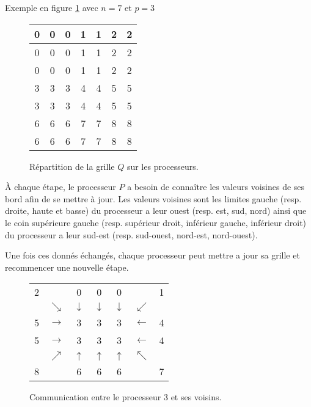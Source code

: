 \documentclass{article}
\begin{document}
Exemple en figure \ref{exemple} avec $n=7$ et $p=3$ 
\begin{figure}[!ht]
\label{exemple}
\begin{center}
\begin{tabular}{|c|c|c||c|c|c||c|}
	\hline
	0 & 0 & 0 & 1 & 1 & 2 & 2 \\
	\hline
	0 & 0 & 0 & 1 & 1 & 2 & 2 \\
	\hline
	0 & 0 & 0 & 1 & 1 & 2 & 2 \\
	\hline \hline
	3 & 3 & 3 & 4 & 4 & 5 & 5 \\
	\hline
	3 & 3 & 3 & 4 & 4 & 5 & 5 \\
	\hline
	6 & 6 & 6 & 7 & 7 & 8 & 8 \\
	\hline \hline
	6 & 6 & 6 & 7 & 7 & 8 & 8 \\
	\hline
\end{tabular}
\end{center}
\caption{Répartition de la grille $Q$ sur les processeurs.}
\end{figure}

\par À chaque étape, le processeur $P$ a besoin de connaître les valeurs voisines de ses bord afin de se mettre à jour. Les valeurs voisines sont les limites gauche (resp. droite, haute et basse) du processeur a leur ouest (resp. est, sud, nord) ainsi que le coin supérieure gauche (resp. supérieur droit, inférieur gauche, inférieur droit) du processeur a leur sud-est (resp. sud-ouest, nord-est, nord-ouest).
\par Une fois ces donnés échangés, chaque processeur peut mettre a jour sa grille et recommencer une nouvelle étape.

\begin{figure}[!ht]
\begin{center}
\begin{tabular}{cc||c|c|c||cc}
	2 &   & 0 & 0 & 0 &   & 1 \\
	  & $\searrow$ & $\downarrow$ & $\downarrow$ & $\downarrow$ & $\swarrow$ & \\
	\hline \hline
	5 & $\rightarrow$ & 3 & 3 & 3 & $\leftarrow$ & 4 \\
	\hline
	5 & $\rightarrow$ & 3 & 3 & 3 & $\leftarrow$ & 4 \\
	\hline \hline
	  & $\nearrow$ & $\uparrow$ & $\uparrow$ & $\uparrow$ & $\nwarrow$ &   \\
	8 &   & 6 & 6 & 6 &   & 7 \\
\end{tabular}
\end{center}
\caption{Communication entre le processeur $3$ et ses voisins.}
\end{figure}
\end{document}
